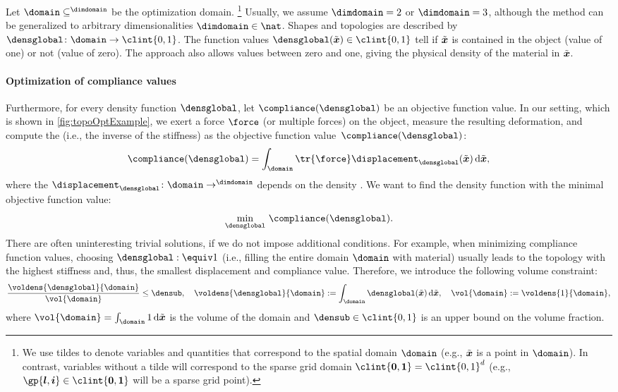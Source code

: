 Let $\domain \subset \real^{\dimdomain}$ be the optimization domain.%
\footnote{%
  We use tildes to denote variables and quantities
  that correspond to the spatial domain $\domain$
  (e.g., $\tilde{{\boldsymbol{x}}}$ is a point in $\domain$).
  In contrast, variables without a tilde will correspond
  to the sparse grid domain $\clint{\*0, \*1} = \clint{0, 1}^d$
  (e.g., $\gp{\*l,\*i} \in \clint{\*0, \*1}$ will be a sparse grid point).%
}
Usually, we assume $\dimdomain = 2$ or $\dimdomain = 3$,
although the method can be generalized to
arbitrary dimensionalities $\dimdomain \in \nat$.
Shapes and topologies are described by 
$\densglobal\colon \domain \to \clint{0, 1}$.
The function values $\densglobal(\tilde{\*x}) \in \clint{0, 1}$
tell if $\tilde{{\boldsymbol{x}}}$ is contained in the object (value of one) or
not (value of zero).
The  approach also allows values between
zero and one, giving the physical density of the material in $\tilde{{\boldsymbol{x}}}$.

\paragraph{Optimization of compliance values}

Furthermore, for every density function $\densglobal$,
let $\compliance(\densglobal)$ be an objective function value.
In our setting, which is shown in \cref{fig:topoOptExample},
we exert a force $\force$ (or multiple forces) on the object,
measure the resulting deformation, and
compute the  (i.e., the inverse of the stiffness) as
the objective function value~$\compliance(\densglobal)$:
\begin{equation}
  \compliance(\densglobal)
  = \int_{\domain} \tr{\force} \displacement_{\densglobal}(\tilde{\*x})
  \diff\tilde{\*x},
\end{equation}
where the 
$\displacement_{\densglobal}\colon \domain \to \real^{\dimdomain}$
depends on the density \cite{Huebner14Mehrdimensionale}.
We want to find the density function
with the minimal objective function value:
\begin{equation}
  \label{eq:topoOptProblemContinuous}
  \min_{\densglobal}\, \compliance(\densglobal).
\end{equation}
There are often uninteresting trivial solutions,
if we do not impose additional conditions.
For example, when minimizing compliance function values,
choosing $\densglobal :\equiv 1$
(i.e., filling the entire domain $\domain$ with material)
usually leads to the topology with the
highest stiffness and, thus, the smallest displacement and compliance value.
Therefore, we introduce the following volume constraint:
\begin{equation}
  \frac{\voldens{\densglobal}{\domain}}{\vol{\domain}} \le \densub,\quad
  \voldens{\densglobal}{\domain}
  := \int_{\domain} \densglobal(\tilde{\*x}) \diff\tilde{\*x},\quad
  \vol{\domain}
  := \voldens{1}{\domain},
\end{equation}
where $\vol{\domain} = \int_{\domain} 1 \diff\tilde{\*x}$
is the volume of the domain and
$\densub \in \clint{0, 1}$ is an upper bound on the volume fraction.


